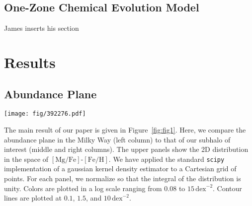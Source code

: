 \documentclass[twocolumn]{aastex631}
\newcommand{\Gyr}{\ensuremath{\textrm{Gyr}}}
\newcommand{\FeH}{\ensuremath{[\textrm{Fe}/\textrm{H}]}}
\newcommand{\MgFe}{\ensuremath{[\textrm{Mg}/\textrm{Fe}]}}
\newcommand{\dex}{\ensuremath{\textrm{dex}}}
\begin{document}
\subsection{One-Zone Chemical Evolution Model}\label{ssec:onezone_met}
James inserts his section

\section{Results}\label{sec:results}
\subsection{Abundance Plane}\label{ssec:plane}

\begin{figure*}
  \centering
  \texttt{[image: fig/392276.pdf]}
  \caption{\textbf{When old stars are $\alpha$-enhanced, our subhalo of interest from TNG displays a prominent bimodality.} The upper left panel shows the distribution in the \MgFe{}-\FeH{} plane of the Milky Way, demonstrating a clear bimodality (data selection given in text). The lower left panel shows the 1D histograms of \MgFe{} at fixed \FeH{} values of $-0.5$, $-0.25$, $0$, and $0.25$ (blue, orange, green, and red, respectively). In the Milky Way, the bimodality is strongest at low metallicities while disappearing at high metallicities. The middle column shows the same plots but for our TNG subhalo of interest (392276) and with the fixed \FeH{} values $0.25\,\dex$ lower. Only faint structure is seen in the lowest bin (blue, $-0.75\,\dex$). The right column shows the same subhalo but after increasing the \MgFe{} value of star particles formed before $z=1.5$ linearly with formation time (with a slope of $0.1\dex/\Gyr$). A clear bimodality is shown in these panels which, unlike in the Milky Way, is present at all metallicities.}
  \label{fig:fig1}
\end{figure*}

The main result of our paper is given in Figure~\ref{fig:fig1}. Here, we compare the abundance plane in the Milky Way (left column) to that of our subhalo of interest (middle and right columns). The upper panels show the 2D distribution in the space of \MgFe{}-\FeH{}. We have applied the standard \texttt{scipy} implementation of a gaussian kernel density estimator to a Cartesian grid of points. For each panel, we normalize so that the integral of the distribution is unity. Colors are plotted in a log scale ranging from $0.08$ to $15\,\dex^{-2}$. Contour lines are plotted at $0.1$, $1.5$, and $10\,\dex^{-2}$.
\end{document}
